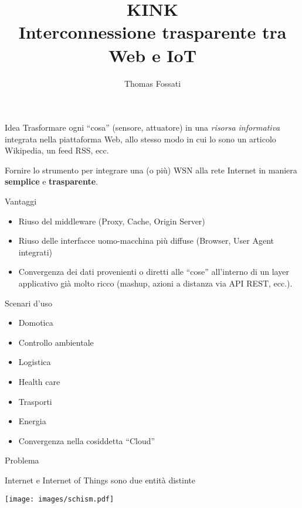 \documentclass{beamer}
\author{Thomas Fossati}
\title{KINK\\ Interconnessione trasparente tra Web e IoT}
\institute{KoanLogic}
\begin{document}
\begin{frame}[plain]
  \titlepage
\end{frame}

\begin{frame}{Idea}
Trasformare ogni ``cosa'' (sensore, attuatore) in una \emph{risorsa informativa} integrata nella piattaforma Web, allo stesso modo in cui lo sono un articolo Wikipedia, un feed RSS, ecc.

\pause
\vspace{0.5cm}
Fornire lo strumento per integrare una (o pi\`u) WSN alla rete Internet in maniera \textbf{semplice} e \textbf{trasparente}.

\end{frame}

\begin{frame}{Vantaggi}
  \begin{itemize}
    \pause
    \item Riuso del middleware (Proxy, Cache, Origin Server)
    \pause
    \item Riuso delle interfacce uomo-macchina pi\`u diffuse (Browser, User Agent integrati)
    \pause
    \item Convergenza dei dati provenienti o diretti alle ``cose'' all'interno di un layer applicativo gi\`a molto ricco (mashup, azioni a distanza via API REST, ecc.).
  \end{itemize}
\end{frame}

\begin{frame}{Scenari d'uso}
  \begin{itemize}
    \pause
    \item Domotica
    \pause
    \item Controllo ambientale
    \pause
    \item Logistica
    \pause
    \item Health care
    \pause
    \item Trasporti
    \pause
    \item Energia
    \pause
    \item Convergenza nella cosiddetta ``Cloud''
  \end{itemize}
\end{frame}

\begin{frame}{Problema}
\begin{center}
Internet e Internet of Things sono due entit\`a distinte
\end{center}
\pause
\begin{center}
  \texttt{[image: images/schism.pdf]} 
\end{center}
\end{frame}
\end{document}
